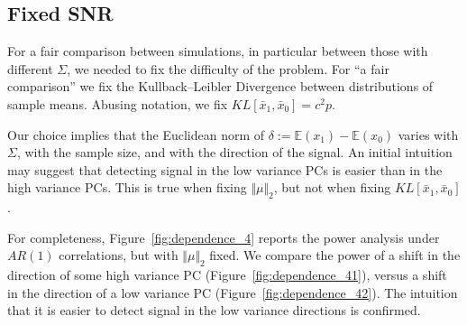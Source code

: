 \documentclass[onecolumn,draftclsnofoot]{IEEEtran}
\begin{document}
\subsection{Fixed SNR}
\label{sec:fix_snr}

For a fair comparison between simulations, in particular between those with different $\Sigma$, we needed to fix the difficulty of the problem.
For ``a fair comparison'' we fix the Kullback–Leibler Divergence between distributions of sample means. Abusing notation, we fix $KL[\bar x_1,\bar x_0]=c^2 p$.

Our choice implies that the Euclidean norm of $\delta:=\mathbb{E}(x_1)-\mathbb{E}(x_0)$ varies with $\Sigma$, with the sample size, and with the direction of the signal.
An initial intuition may suggest that detecting signal in the low variance PCs is easier than in the high variance PCs. 
This is true when fixing $\Vert \mu \Vert_2$, but not when fixing $KL[\bar x_1,\bar x_0]$.

For completeness, Figure~\ref{fig:dependence_4} reports the power analysis under $AR(1)$ correlations, but with $\Vert \mu \Vert_2$ fixed.
We compare the power of a shift in the direction of some high variance PC (Figure~\ref{fig:dependence_41}), versus a shift in the direction of a low variance PC (Figure~\ref{fig:dependence_42}).
The intuition that it is easier to detect signal in the low variance directions is confirmed. 
\end{document}

